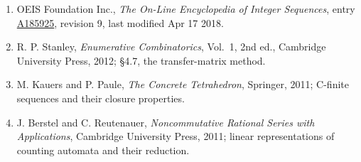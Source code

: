 \documentclass[11pt]{article}
\theoremstyle{definition}
\begin{document}
\begin{enumerate}

\item OEIS Foundation Inc., \emph{The On-Line Encyclopedia of Integer Sequences}, entry \href{https://oeis.org/A185925}{A185925}, revision 9, last modified Apr 17 2018.

\item R. P. Stanley, \emph{Enumerative Combinatorics}, Vol.~1, 2nd ed., Cambridge University Press, 2012; \S4.7, the transfer-matrix method.

\item M. Kauers and P. Paule, \emph{The Concrete Tetrahedron}, Springer, 2011; C-finite sequences and their closure properties.

\item J. Berstel and C. Reutenauer, \emph{Noncommutative Rational Series with Applications}, Cambridge University Press, 2011; linear representations of counting automata and their reduction.

\end{enumerate}
\end{document}
